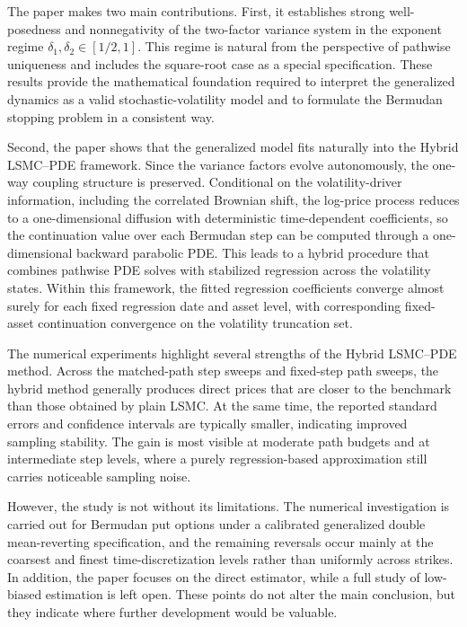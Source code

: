 \documentclass[pdflatex,sn-mathphys-num]{sn-jnl}
\theoremstyle{thmstyleone}%
\theoremstyle{thmstylethree}%
\theoremstyle{thmstyletwo}%
\begin{document}
The paper makes two main contributions. First, it establishes strong well-posedness and nonnegativity of the two-factor variance system in the exponent regime $\delta_1, \delta_2 \in [1/2,1]$. This regime is natural from the perspective of pathwise uniqueness and includes the square-root case as a special specification. These results provide the mathematical foundation required to interpret the generalized dynamics as a valid stochastic-volatility model and to formulate the Bermudan stopping problem in a consistent way.

Second, the paper shows that the generalized model fits naturally into the Hybrid LSMC--PDE framework. Since the variance factors evolve autonomously, the one-way coupling structure is preserved. Conditional on the volatility-driver information, including the correlated Brownian shift, the log-price process reduces to a one-dimensional diffusion with deterministic time-dependent coefficients, so the continuation value over each Bermudan step can be computed through a one-dimensional backward parabolic PDE. This leads to a hybrid procedure that combines pathwise PDE solves with stabilized regression across the volatility states. Within this framework, the fitted regression coefficients converge almost surely for each fixed regression date and asset level, with corresponding fixed-asset continuation convergence on the volatility truncation set.

The numerical experiments highlight several strengths of the Hybrid LSMC--PDE method. Across the matched-path step sweeps and fixed-step path sweeps, the hybrid method generally produces direct prices that are closer to the benchmark than those obtained by plain LSMC. At the same time, the reported standard errors and confidence intervals are typically smaller, indicating improved sampling stability. The gain is most visible at moderate path budgets and at intermediate step levels, where a purely regression-based approximation still carries noticeable sampling noise.

However, the study is not without its limitations. The numerical investigation is carried out for Bermudan put options under a calibrated generalized double mean-reverting specification, and the remaining reversals occur mainly at the coarsest and finest time-discretization levels rather than uniformly across strikes. In addition, the paper focuses on the direct estimator, while a full study of low-biased estimation is left open. These points do not alter the main conclusion, but they indicate where further development would be valuable.
\end{document}
